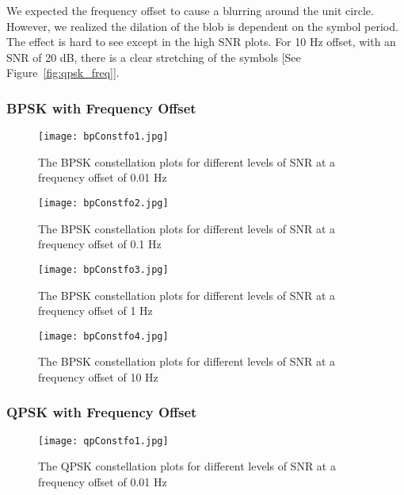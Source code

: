 \documentclass[]{article}
\begin{document}
We expected the frequency offset to cause a blurring around the unit circle.  However, we realized the dilation of the blob is dependent on the symbol period.  The effect is hard to see except in the high SNR plots.  For 10 Hz offset, with an SNR of 20 dB, there is a clear stretching of the symbols [See Figure~\ref{fig:qpsk_freq}].    

\subsubsection{BPSK with Frequency Offset}
\label{sec:bpsk_freqConst}
\begin{figure}[H]
\centering
\hspace*{-2cm}\texttt{[image: bpConstfo1.jpg]}
\caption{The BPSK constellation plots for different levels of SNR at a frequency offset of 0.01 Hz}
\end{figure}

\begin{figure}[H]
\centering
\hspace*{-2cm}\texttt{[image: bpConstfo2.jpg]}
\caption{The BPSK constellation plots for different levels of SNR at a frequency offset of 0.1 Hz}
\end{figure}

\begin{figure}[H]
\centering
\hspace*{-2cm}\texttt{[image: bpConstfo3.jpg]}
\caption{The BPSK constellation plots for different levels of SNR at a frequency offset of 1 Hz}
\end{figure}

\begin{figure}[H]
\centering
\hspace*{-2cm}\texttt{[image: bpConstfo4.jpg]}
\caption{The BPSK constellation plots for different levels of SNR at a frequency offset of 10 Hz}
\end{figure}

\subsubsection{QPSK with Frequency Offset}
\begin{figure}[H]
\centering
\hspace*{-2cm}\texttt{[image: qpConstfo1.jpg]}
\caption{The QPSK constellation plots for different levels of SNR at a frequency offset of 0.01 Hz}
\end{figure}
\end{document}
